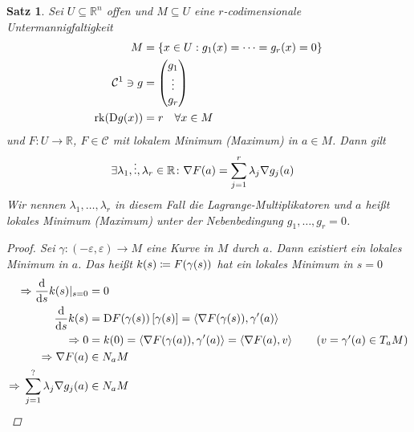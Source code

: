 \documentclass[11pt, twoside, a4paper]{article}
\theoremstyle{plain}
\newtheorem{satz}[blockelement]{Satz}
\numberwithin{equation}{subsection}
\newcommand{\set}[1]{\left\{#1\right\}}
\newcommand{\pair}[1]{\left(#1\right)}
\newcommand{\of}[1]{\mathopen{}\mathclose{}\bgroup\left(#1\aftergroup\egroup\right)}
\newcommand{\interv}[1]{\left[#1\right]}
\newcommand{\sprod}[1]{\left<#1\right>}
\newcommand{\impl}[0]{\Rightarrow{}}
\newcommand{\dif}{\mathop{}\!\mathrm{d}}
\DeclareMathOperator{\D}{D\!}
\DeclareMathOperator{\rank}{rk}
\newcommand{\R}{\mathbb{R}}
\newcommand{\mC}{\mathcal{C}}
\begin{document}
    \begin{satz}
        Sei $U\subseteq\R^n$ offen und $M\subseteq U$ eine $r$-codimensionale Untermannigfaltigkeit
        \begin{align*}
            M &= \set{x\in U: g_1\of{x} = \dots = g_r\of{x} = 0}\\
            \mC^1 \ni g &= \begin{pmatrix}
                               g_1    \\
                               \vdots \\
                               g_r
            \end{pmatrix}\\
            \rank\of{\D g\of{x}} &= r\quad\forall x\in M\\
        \end{align*}
        und $F: U\to\R$, $F\in\mC$ mit lokalem Minimum (Maximum) in $a\in M$. Dann gilt
        \begin{align*}
            \exists\lambda_1, \vdots, \lambda_r\in\R\colon \nabla F\of{a} &= \sum_{j=1}^{r} \lambda_j \nabla g_j\of{a}
        \end{align*}
        Wir nennen $\lambda_1, \ldots, \lambda_r$ in diesem Fall die Lagrange-Multiplikatoren und $a$ heißt lokales Minimum (Maximum) unter der Nebenbedingung $g_1, \ldots, g_r = 0$.
        \begin{proof}
            Sei $\gamma: \pair{-\varepsilon, \varepsilon} \to M$ eine Kurve in $M$ durch $a$. Dann existiert ein lokales Minimum in $a$. Das heißt $k\of{s} \coloneqq F\of{\gamma\of{s}}$ hat ein lokales Minimum in $s=0$
            \begin{align*}
                \impl \frac{\dif}{\dif s} k\of{s}\vert_{s=0} &= 0\\
                \frac{\dif}{\dif s} k\of{s} &= \D F\of{\gamma\of{s}}\interv{\gamma\of{s}} = \sprod{\nabla F\of{\gamma\of{s}}, \gamma'\of{a}}\\
                \impl 0 &= k\of{0} = \sprod{\nabla  F\of{\gamma\of{a}}, \gamma'\of{a}} = \sprod{\nabla F\of{a}, v}\tag{$v = \gamma'\of{a}\in T_a M$}\\
                \impl \nabla F\of{a} &\in N_{a} M\\
                \impl \sum_{j=1}^{?} \lambda_j \nabla g_j\of{a} &\in N_a M
            \end{align*}
        \end{proof}
    \end{satz}
\end{document}
